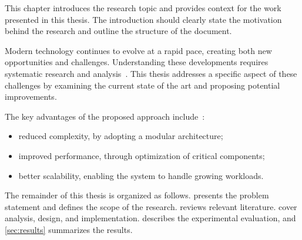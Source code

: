
This chapter introduces the research topic and provides context for the work presented in this thesis.
The introduction should clearly state the motivation behind the research and outline the structure of the document.

Modern technology continues to evolve at a rapid pace, creating both new opportunities and challenges.
Understanding these developments requires systematic research and analysis~\cite{wilson2014best}.
This thesis addresses a specific aspect of these challenges by examining the current state of the art and proposing potential improvements.

The key advantages of the proposed approach include~\cite{dragoni2017microservices}:
\begin{itemize}
  \item reduced complexity, by adopting a modular architecture;
  \item improved performance, through optimization of critical components;
  \item better scalability, enabling the system to handle growing workloads.
\end{itemize}

The remainder of this thesis is organized as follows.
 presents the problem statement and defines the scope of the research.
 reviews relevant literature.
 cover analysis, design, and implementation.
 describes the experimental evaluation, and \cref{sec:results} summarizes the results.
